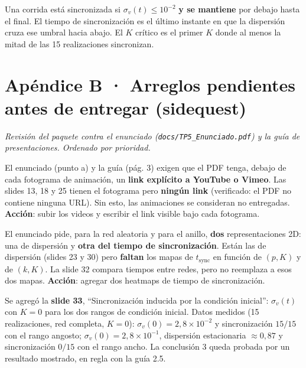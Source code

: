 \documentclass[11pt]{article}
\begin{document}
\begin{tcolorbox}[colback=white,colframe=ianColor,title=\textbf{¿Cómo definieron el tiempo de sincronización?} (Ian / Nico)]
\small Una corrida está sincronizada si $\sigma_v(t)\le 10^{-2}$ \textbf{y se mantiene} por debajo hasta el final. El tiempo de sincronización es el último instante en que la dispersión cruza ese umbral hacia abajo. El $K$ crítico es el primer $K$ donde al menos la mitad de las 15 realizaciones sincronizan.
\end{tcolorbox}

\newpage
\section*{Apéndice B · Arreglos pendientes antes de entregar (sidequest)}

\textit{\small Revisión del paquete contra el enunciado (\texttt{docs/TP5\_Enunciado.pdf}) y la guía de presentaciones. Ordenado por prioridad.}

\begin{tcolorbox}[colback=white,colframe=red!70!black,title=\textbf{CRÍTICO · Faltan los links a las animaciones}]
\small
El enunciado (punto a) y la guía (pág. 3) exigen que el PDF tenga, debajo de cada fotograma de animación, un \textbf{link explícito a YouTube o Vimeo}. Las slides 13, 18 y 25 tienen el fotograma pero \textbf{ningún link} (verificado: el PDF no contiene ninguna URL). Sin esto, las animaciones se consideran no entregadas. \textbf{Acción}: subir los videos y escribir el link visible bajo cada fotograma.
\end{tcolorbox}

\begin{tcolorbox}[colback=white,colframe=red!70!black,title=\textbf{ALTO · Faltan dos mapas 2D de tiempo de sincronización}]
\small
El enunciado pide, para la red aleatoria y para el anillo, \textbf{dos} representaciones 2D: una de dispersión y \textbf{otra del tiempo de sincronización}. Están las de dispersión (slides 23 y 30) pero \textbf{faltan} los mapas de $t_{\text{sync}}$ en función de $(p,K)$ y de $(k,K)$. La slide 32 compara tiempos entre redes, pero no reemplaza a esos dos mapas. \textbf{Acción}: agregar dos heatmaps de tiempo de sincronización.
\end{tcolorbox}

\begin{tcolorbox}[colback=white,colframe=green!55!black,title=\textbf{RESUELTO · La conclusión 3 ya tiene figura de respaldo}]
\small
Se agregó la \textbf{slide 33}, ``Sincronización inducida por la condición inicial'': $\sigma_v(t)$ con $K=0$ para los dos rangos de condición inicial. Datos medidos (15 realizaciones, red completa, $K=0$): $\sigma_v(0)=2{,}8\times10^{-2}$ y sincronización $15/15$ con el rango angosto; $\sigma_v(0)=2{,}8\times10^{-1}$, dispersión estacionaria $\approx 0{,}87$ y sincronización $0/15$ con el rango ancho. La conclusión 3 queda probada por un resultado mostrado, en regla con la guía 2.5.
\end{tcolorbox}
\end{document}
